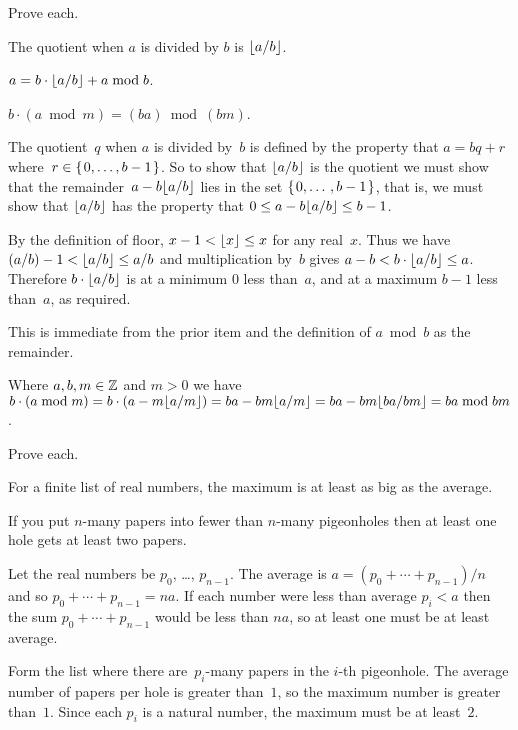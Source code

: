\documentclass{ibl}  %
\begin{document}
\begin{ex} Prove each.
\begin{exes} 
\item The quotient when $a$ is divided by $b$ is $\lfloor a/b \rfloor$.
\item $a =b\cdot\lfloor a/b \rfloor+a\bmod b$.    
\item $b\cdot(a\bmod m)=(ba)\bmod{(bm)}$.    
\end{exes}
\begin{ans}
\begin{exes}
\item The quotient~$q$ when $a$ is divided by~$b$ is defined by the
  property that $a=bq+r$ where~$r\in\mbox{$\{\hspace{0.1em}0,\ldots,b-1\hspace{0.1em}\}$}$.
  So to show that $\lfloor a/b \rfloor$ is the quotient we must show that 
  the remainder~$a-b\lfloor a/b \rfloor$
  lies in the set $\mbox{$\{\hspace{0.1em}0,\ldots\,,b-1\hspace{0.1em}\}$}$, that is, 
  we must show that $\lfloor a/b \rfloor$ has the property 
  that $0\leq a-b\lfloor a/b \rfloor\leq b-1$.
  
  By the definition of floor, $x-1<\lfloor x \rfloor\leq x$ for any real~$x$. 
  Thus we have
  $(a/b)-1< \lfloor a/b \rfloor\leq a/b$ and multiplication by~$b$ gives
  $a-b< b\cdot\lfloor a/b \rfloor\leq a$.
  Therefore $b\cdot\lfloor a/b \rfloor$ is at a minimum $0$ less than~$a$, and
  at a maximum $b-1$ less than~$a$, as required.
\item This is immediate from the prior item and the 
  definition of $a\bmod b$ as the remainder.
\item Where $a, b, m\in\mathbb{Z}$ and $m>0$ we have
  $b\cdot(a\bmod m)=b\cdot(a-m\lfloor a/m \rfloor)
  =ba- bm\lfloor a/m \rfloor
  =ba- bm\lfloor ba/bm \rfloor
  =ba\bmod bm$.    
\end{exes}
\end{ans}
\end{ex}

\begin{ex}  Prove each.
\begin{exes}
\item For a finite list of real numbers,
  the maximum is at least as big as the average.
\item If you put $n$-many papers into fewer than $n$-many
  pigeonholes then at least one hole gets at least two papers.    
\end{exes}
\begin{ans}
\begin{exes}
\item Let the real numbers be $p_0$, \ldots, $p_{n-1}$.
  The average is $a=(p_0+\cdots+p_{n-1})/n$ and so 
  $p_0+\cdots+p_{n-1}=na$.
  If each number were less than average $p_i<a$ then the sum
  $p_0+\cdots+p_{n-1}$ would be less than $na$, so at least
  one must be at least average.
\item Form the list where there are~$p_i$-many papers in the $i$-th pigeonhole.
  The average number of papers per hole is greater than~$1$, 
  so the maximum number is greater than~$1$.
  Since each $p_i$ is a natural number, the maximum must be at least~$2$.      
\end{exes}
\end{ans}
\end{ex}
\end{document}
